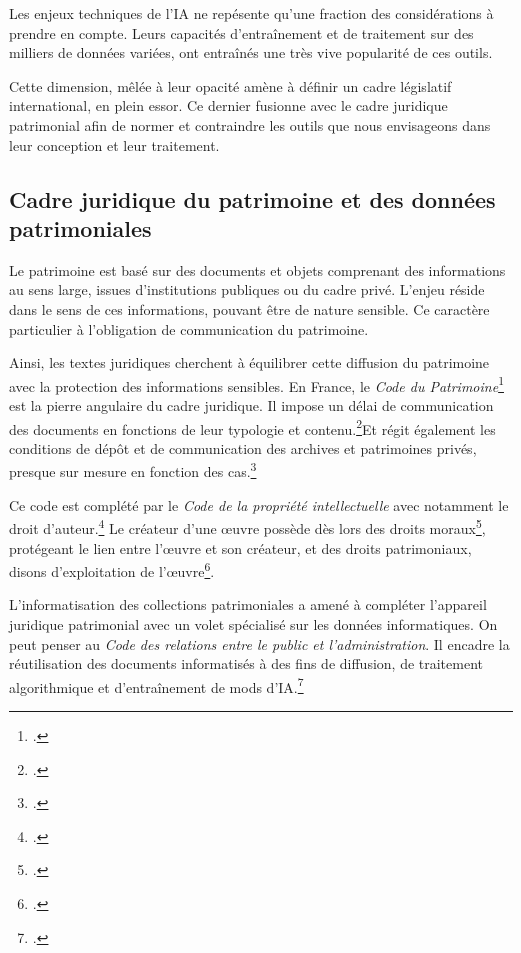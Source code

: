
\label{juridique}

Les enjeux techniques de l'\gls{IA} ne repésente qu'une fraction des considérations à prendre en compte. Leurs capacités d'entraînement et de traitement sur des milliers de données variées, ont entraînés une très vive popularité de ces outils. 

Cette dimension, mêlée à leur opacité amène à définir un cadre législatif international, en plein essor. Ce dernier fusionne avec le cadre juridique patrimonial afin de normer et contraindre les outils que nous envisageons dans leur conception et leur traitement.

\subsection{Cadre juridique du patrimoine et des données patrimoniales}

Le patrimoine est basé sur des documents et objets comprenant des informations au sens large, issues d'institutions publiques ou du cadre privé. L'enjeu réside dans le sens de ces informations, pouvant être de nature sensible. Ce caractère particulier  à l'obligation de communication du patrimoine. 

Ainsi, les textes juridiques cherchent à équilibrer cette diffusion du patrimoine avec la protection des informations sensibles. En France, le \textit{Code du Patrimoine}\footcite{CodePatrimoineLegifrance} est la pierre angulaire du cadre juridique. Il impose un délai de communication des documents en fonctions de leur typologie et contenu.\footcite[Article 213.1 à 213.3]{CodePatrimoineLegifrance}Et régit également les conditions de dépôt et de communication des archives et patrimoines privés, presque sur mesure en fonction des cas.\footcite[Article 213-6]{CodePatrimoineLegifrance}

Ce code est complété par le \textit{Code de la propriété intellectuelle} avec notamment le droit d'auteur.\footcite{DroitDauteurINPI2024} Le créateur d'une \oe{uvre} possède dès lors des droits moraux\footcite[Article 121-1 à 121-9]{DroitDauteurINPI2024}, protégeant le lien entre l'\oe{uvre} et son créateur, et des droits patrimoniaux, disons d'exploitation de l'\oe{uvre}\footcite[Article 122-1 à 122-12]{DroitDauteurINPI2024}.\newline

L'informatisation des collections patrimoniales a amené à compléter l'appareil juridique patrimonial avec un volet spécialisé sur les données informatiques. On peut penser au \textit{Code des relations entre le public et l'administration}. Il encadre la réutilisation des documents informatisés à des fins de diffusion, de traitement algorithmique et d'entraînement de \glspl{mod} d'\gls{IA}.\footcite{LivreIIILACCES}

